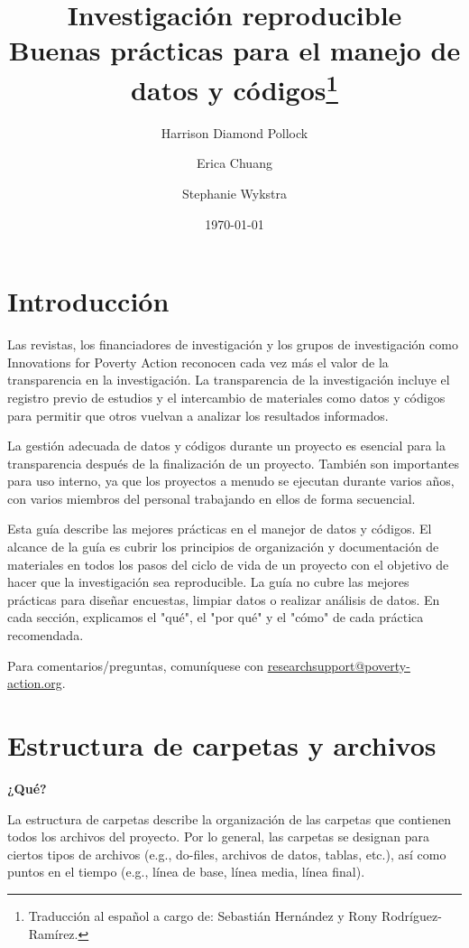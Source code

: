 \documentclass[11pt,en]{elegantpaper}
\title{Investigación reproducible \\ Buenas prácticas para el manejo de datos y códigos\footnote{Traducción al español a cargo de: Sebastián Hernández y Rony Rodríguez-Ramírez.}}
\author{Harrison Diamond Pollock \and Erica Chuang \and Stephanie Wykstra}
\date{\today}
\begin{document}
\maketitle
\tableofcontents
\newpage 
\section{Introducción}
Las revistas, los financiadores de investigación y los grupos de investigación como Innovations for Poverty Action reconocen cada vez más el valor de la transparencia en la investigación. La transparencia de la investigación incluye el registro previo de estudios y el intercambio de materiales como datos y códigos para permitir que otros vuelvan a analizar los resultados informados.

La gestión adecuada de datos y códigos durante un proyecto es esencial para la transparencia después de la finalización de un proyecto. También son importantes para uso interno, ya que los proyectos a menudo se ejecutan durante varios años, con varios miembros del personal trabajando en ellos de forma secuencial.

Esta guía describe las mejores prácticas en el manejor de datos y códigos. El alcance de la guía es cubrir los principios de organización y documentación de materiales en todos los pasos del ciclo de vida de un proyecto con el objetivo de hacer que la investigación sea reproducible. La guía no cubre las mejores prácticas para diseñar encuestas, limpiar datos o realizar análisis de datos. En cada sección, explicamos el "qué", el "por qué" y el "cómo" de cada práctica recomendada.

Para comentarios/preguntas, comuníquese con \href{mailto:researchsupport@poverty-action.org}{researchsupport@poverty-action.org}.
\newpage 
\section{Estructura de carpetas y archivos}
\textbf{¿Qué?}

La estructura de carpetas describe la organización de las carpetas que contienen todos los archivos del proyecto. Por lo general, las carpetas se designan para ciertos tipos de archivos (e.g., do-files, archivos de datos, tablas, etc.), así como puntos en el tiempo (e.g., línea de base, línea media, línea final).
\end{document}
